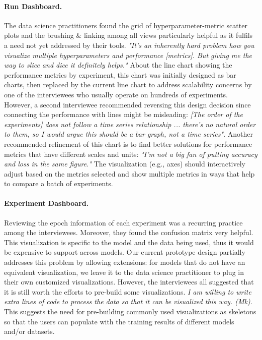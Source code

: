 \documentclass[preprint]{vgtc}        %
\begin{document}
\paragraph{Run Dashboard.} 
The data science practitioners found the grid of hyperparameter-metric scatter plots and the brushing \& linking among all views particularly helpful as it fulfils a need not yet addressed by their tools. \textit{"It’s an inherently hard problem how you visualize multiple hyperparameters and performance [metrics]. But giving me the way to slice and dice it definitely helps."} About the line chart showing the performance metrics by experiment, this chart was initially designed as bar charts, then replaced by the current line chart to address scalability concerns by one of the interviewees who usually operate on hundreds of experiments. However, a second interviewee recommended reversing this design decision since connecting the performance with lines might be misleading: \textit{[The order of the experiments] does not follow a time series relationship ... there's no natural order to them, so I would argue this should be a bar graph, not a time series"}. Another recommended refinement of this chart is to find better solutions for performance metrics that have different scales and units: \textit{"I'm not a big fan of putting accuracy and loss in the same figure."} The visualization (e.g., axes) should interactively adjust based on the metrics selected and show multiple metrics in ways that help to compare a batch of experiments.

\paragraph{Experiment Dashboard.} 
Reviewing the epoch information of each experiment was a recurring practice among the interviewees. Moreover, they found the confusion matrix very helpful. This visualization is specific to the model and the data being used, thus it would be expensive to support across models. Our current prototype design partially addresses this problem by allowing extensions: for models that do not have an equivalent visualization, we leave it to the data science practitioner to plug in their own customized visualizations. However, the interviewees all suggested that it is still worth the efforts to pre-build some visualizations. \textit{I am willing to write extra lines of code to process the data so that it can be visualized this way. (Mk).} This suggests the need for pre-building commonly used visualizations as skeletons so that the users can populate with the training results of different models and/or datasets. 
\end{document}
